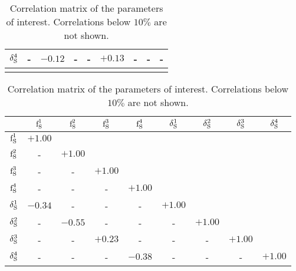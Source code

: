 \begin{table}
\begin{tabular}{ccccccccc}
$          \delta_{\text{S}}^{4}$ &     -    &  $-0.12$ &     -    &     -    &  $+0.13$ &     -    &     -    &     -     \\
\hline
\vspace{0.5cm}
\end{tabular}
\begin{tabular}{ccccccccc}
  \hline
  & $\text{f}_{\text{S}}^{1}$ & $\text{f}_{\text{S}}^{2}$ & $\text{f}_{\text{S}}^{3}$ & $\text{f}_{\text{S}}^{4}$ & $\delta_{\text{S}}^{1}$ & $\delta_{\text{S}}^{2}$ & $\delta_{\text{S}}^{3}$ & $\delta_{\text{S}}^{4}$  \\
  \hline
$              \text{f}_{\text{S}}^{1}$ & $+1.00$ &  &  &  &  &  &  & \\
$              \text{f}_{\text{S}}^{2}$ &    -    &  $+1.00$ &  &  &  &  &  &  \\
$              \text{f}_{\text{S}}^{3}$ &    -    &     -    &  $+1.00$ &  &  &  &  &  \\
$              \text{f}_{\text{S}}^{4}$ &    -    &     -    &     -    &  $+1.00$ &  &  &  &  \\
$          \delta_{\text{S}}^{1}$ & $-0.34$ &     -    &     -    &     -    &  $+1.00$ &  &  &  \\
$          \delta_{\text{S}}^{2}$ &    -    &  $-0.55$ &     -    &     -    &     -    &  $+1.00$ &  &  \\
$          \delta_{\text{S}}^{3}$ &    -    &     -    &  $+0.23$ &     -    &     -    &     -    &  $+1.00$ &  \\
$          \delta_{\text{S}}^{4}$ &    -    &     -    &     -    &  $-0.38$ &     -    &     -    &     -    &  $+1.00$ \\
\end{tabular}

\caption{Correlation matrix of the parameters of interest. Correlations below $10\%$ are not shown.}
\label{correlation_matrix}
\end{table}
